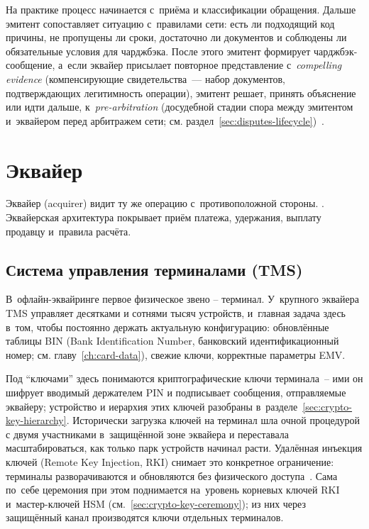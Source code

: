 На практике процесс начинается с~приёма и классификации обращения.
Дальше эмитент сопоставляет ситуацию с~правилами сети: есть ли
подходящий код причины, не пропущены ли сроки, достаточно ли
документов и соблюдены ли обязательные условия для чарджбэка.
После этого эмитент формирует чарджбэк-сообщение, а~если эквайер
присылает повторное представление с~\textit{compelling evidence}
(компенсирующие свидетельства~--- набор документов, подтверждающих
легитимность операции), эмитент решает, принять объяснение или идти
дальше, к~\textit{pre-arbitration} (досудебной стадии спора между
эмитентом и~эквайером перед арбитражем сети; см.
раздел~\ref{sec:disputes-lifecycle})~\cite{visa-core-rules,mc-chargeback-guide,visa-vcr-merchants}.

\section{Эквайер}\label{sec:ia-acquirer}

Эквайер (acquirer) видит ту же операцию с~противоположной стороны.
. Эквайерская архитектура покрывает
приём платежа, удержания, выплату продавцу и~правила расчёта.

\subsection*{Система управления терминалами (TMS)}

В~офлайн-эквайринге первое физическое звено -- терминал. У~крупного
эквайера TMS управляет десятками и сотнями тысяч устройств, и~главная
задача здесь в~том, чтобы постоянно держать актуальную конфигурацию: обновлённые
таблицы BIN (Bank Identification Number, банковский идентификационный номер;
см. главу~\ref{ch:card-data}), свежие ключи, корректные параметры EMV.

Под \enquote{ключами} здесь понимаются криптографические ключи
терминала~-- ими он шифрует вводимый держателем PIN и подписывает
сообщения, отправляемые эквайеру; устройство и иерархия этих ключей
разобраны в~разделе~\ref{sec:crypto-key-hierarchy}. Исторически загрузка ключей
на терминал шла очной процедурой с двумя участниками
в~защищённой зоне эквайера и переставала масштабироваться, как только
парк устройств начинал расти. Удалённая инъекция ключей (Remote Key
Injection, RKI) снимает это конкретное ограничение: терминалы
разворачиваются и обновляются без физического
доступа~\cite{visa-tpa-registration-program-faqs}. Сама по~себе
церемония при этом поднимается на~уровень корневых
ключей RKI и~мастер-ключей HSM (см.\ \ref{sec:crypto-key-ceremony});
из них через защищённый канал производятся ключи отдельных
терминалов.

